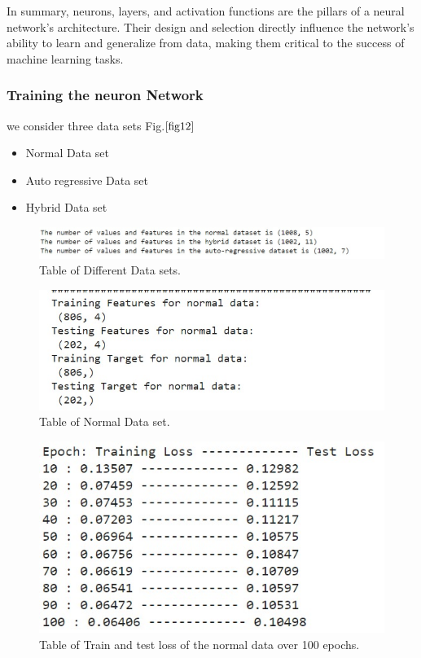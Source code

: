 \documentclass[english,12pt, titlepage]{article}
\begin{document}
	
	
	In summary, neurons, layers, and activation functions are the pillars of a neural network's architecture. Their design and selection directly influence the network's ability to learn and generalize from data, making them critical to the success of machine learning tasks.
	
	
	\subsubsection{Training the neuron Network}
	we consider three data sets Fig.$\ref{fig12}$
	\begin{itemize}
		\item Normal Data set
		\item Auto regressive Data set
		\item Hybrid Data set
	\end{itemize}
	
	\begin{figure}[!ht]
		\centering
		\includegraphics[width=0.9\linewidth]{fig11.jpeg}
		\caption{Table of Different Data sets.}\label{fig12}
	\end{figure}
	
	
	
	\begin{figure}[!ht]
		\centering
		\includegraphics[width=0.6\linewidth]{nor.jpeg}
		\caption{Table of Normal Data set.}\label{fig13}
	\end{figure}
	
	\begin{figure}[!ht]
		\centering
		\includegraphics[width=0.5\linewidth]{enor.jpeg}
		\caption{Table of Train and test loss of the normal data over 100 epochs.}	\label{fig17}
	\end{figure}
	
\end{document}
